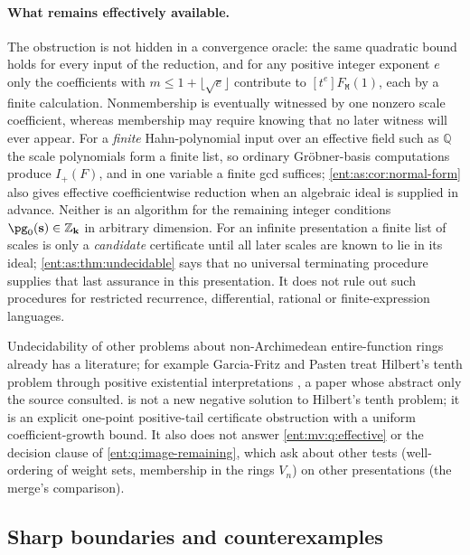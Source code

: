 \documentclass[11pt]{article}
\theoremstyle{plain}
\theoremstyle{plain}
\theoremstyle{plain}
\theoremstyle{definition}
\theoremstyle{definition}
\theoremstyle{definition}
\theoremstyle{definition}
\theoremstyle{remark}
\newcommand{\Q}{\mathbb Q}\newcommand{\Z}{\mathbb Z}\newcommand{\N}{\mathbb N}
\newcommand{\K}{K_\Gamma}\newcommand{\KD}{K_\Delta}
\newcommand{\kk}{\mathbf k}\newcommand{\PP}{\mathbb P}
\newcommand{\Oz}{\mathbf{Oz}}\newcommand{\Ed}{\mathcal E_{\Gamma,d}}
\newcommand{\Zk}{\Z_{\kk}}\newcommand{\OzK}{\Oz_{\K}}
\begin{document}
\paragraph{What remains effectively available.} The obstruction is not
hidden in a convergence oracle: the same quadratic bound holds for every input
of the reduction, and for any positive integer exponent $e$ only the
coefficients with $m\le1+\lfloor\sqrt e\rfloor$ contribute to
$[t^e]F_{\mathtt M}(1)$, each by a finite calculation. Nonmembership is
eventually witnessed by one nonzero scale coefficient, whereas membership may
require knowing that no later witness will ever appear. For a \emph{finite}
Hahn-polynomial input over an effective field such as $\Q$ the scale
polynomials form a finite list, so ordinary Gr\"obner-basis computations
produce $I_+(F)$, and in one variable a finite gcd suffices;
\cref{ent:as:cor:normal-form} also gives effective coefficientwise reduction
when an algebraic ideal is supplied in advance. Neither is an algorithm for
the remaining integer conditions $\pg_0(\mathbf s)\in\Zk$ in arbitrary
dimension. For an infinite presentation a finite list of scales is only a
\emph{candidate} certificate until all later scales are known to lie in its
ideal; \cref{ent:as:thm:undecidable} says that no universal terminating
procedure supplies that last assurance in this presentation. It does not rule
out such procedures for restricted recurrence, differential, rational or
finite-expression languages.

Undecidability of other problems about non-Archimedean entire-function rings
already has a literature; for example Garcia-Fritz and Pasten treat Hilbert's
tenth problem through positive existential interpretations
\cite{GarciaFritzPasten}, a paper whose abstract only the source consulted.
 is not a new negative solution to Hilbert's
tenth problem; it is an explicit one-point positive-tail certificate
obstruction with a uniform coefficient-growth bound. It also does not answer
\cref{ent:mv:q:effective} or the decision clause of
\cref{ent:q:image-remaining}, which ask about other tests (well-ordering of
weight sets, membership in the rings $V_n$) on other presentations (the
merge's comparison).

\subsection{Sharp boundaries and counterexamples}
\label{ent:as:subsec:boundaries}
\end{document}
